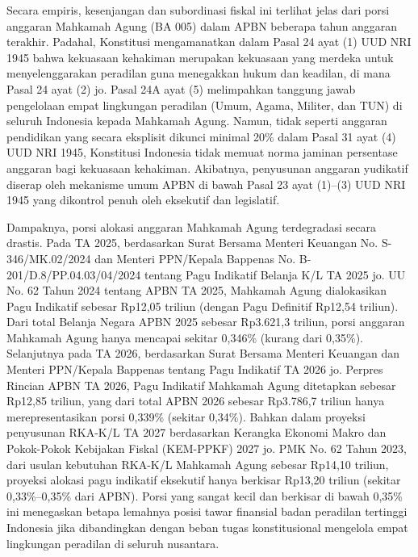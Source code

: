 \documentclass[12pt, a4paper]{article}
\begin{document}
Secara empiris, kesenjangan dan subordinasi fiskal ini terlihat jelas dari porsi anggaran Mahkamah Agung (BA 005) dalam APBN beberapa tahun anggaran terakhir. Padahal, Konstitusi mengamanatkan dalam Pasal 24 ayat (1) UUD NRI 1945 bahwa kekuasaan kehakiman merupakan kekuasaan yang merdeka untuk menyelenggarakan peradilan guna menegakkan hukum dan keadilan, di mana Pasal 24 ayat (2) jo. Pasal 24A ayat (5) melimpahkan tanggung jawab pengelolaan empat lingkungan peradilan (Umum, Agama, Militer, dan TUN) di seluruh Indonesia kepada Mahkamah Agung. Namun, tidak seperti anggaran pendidikan yang secara eksplisit dikunci minimal 20\% dalam Pasal 31 ayat (4) UUD NRI 1945, Konstitusi Indonesia tidak memuat norma jaminan persentase anggaran bagi kekuasaan kehakiman. Akibatnya, penyusunan anggaran yudikatif diserap oleh mekanisme umum APBN di bawah Pasal 23 ayat (1)--(3) UUD NRI 1945 yang dikontrol penuh oleh eksekutif dan legislatif.

Dampaknya, porsi alokasi anggaran Mahkamah Agung terdegradasi secara drastis. Pada TA 2025, berdasarkan Surat Bersama Menteri Keuangan No. S-346/\allowbreak{}MK.02/\allowbreak{}2024 dan Menteri PPN/Kepala Bappenas No. B-201/\allowbreak{}D.8/\allowbreak{}PP.04.03/\allowbreak{}04/\allowbreak{}2024 tentang Pagu Indikatif Belanja K/L TA 2025 jo. UU No. 62 Tahun 2024 tentang APBN TA 2025, Mahkamah Agung dialokasikan Pagu Indikatif sebesar Rp12,05 triliun (dengan Pagu Definitif Rp12,54 triliun). Dari total Belanja Negara APBN 2025 sebesar Rp3.621,3 triliun, porsi anggaran Mahkamah Agung hanya mencapai sekitar 0,346\% (kurang dari 0,35\%). Selanjutnya pada TA 2026, berdasarkan Surat Bersama Menteri Keuangan dan Menteri PPN/Kepala Bappenas tentang Pagu Indikatif TA 2026 jo. Perpres Rincian APBN TA 2026, Pagu Indikatif Mahkamah Agung ditetapkan sebesar Rp12,85 triliun, yang dari total APBN 2026 sebesar Rp3.786,7 triliun hanya merepresentasikan porsi 0,339\% (sekitar 0,34\%). Bahkan dalam proyeksi penyusunan RKA-K/L TA 2027 berdasarkan Kerangka Ekonomi Makro dan Pokok-Pokok Kebijakan Fiskal (KEM-PPKF) 2027 jo. PMK No. 62 Tahun 2023, dari usulan kebutuhan RKA-K/L Mahkamah Agung sebesar Rp14,10 triliun, proyeksi alokasi pagu indikatif eksekutif hanya berkisar Rp13,20 triliun (sekitar 0,33\%--0,35\% dari APBN). Porsi yang sangat kecil dan berkisar di bawah 0,35\% ini menegaskan betapa lemahnya posisi tawar finansial badan peradilan tertinggi Indonesia jika dibandingkan dengan beban tugas konstitusional mengelola empat lingkungan peradilan di seluruh nusantara.
\end{document}
